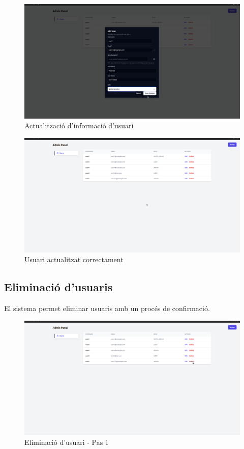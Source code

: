 \begin{figure}[H]
\centering
\includegraphics[width=0.8\linewidth]{Figures/implementacio/adminPanelUserUpdate.png}
\caption{Actualització d'informació d'usuari}
\label{fig:adminPanelUserUpdate}
\end{figure}

\begin{figure}[H]
\centering
\includegraphics[width=0.8\linewidth]{Figures/implementacio/adminPanelUserUpdateSuccess.png}
\caption{Usuari actualitzat correctament}
\label{fig:adminPanelUserUpdateSuccess}
\end{figure}

\subsection{Eliminació d'usuaris}

El sistema permet eliminar usuaris amb un procés de confirmació.

\begin{figure}[H]
\centering
\includegraphics[width=0.8\linewidth]{Figures/implementacio/adminPanelUserDelete.png}
\caption{Eliminació d'usuari - Pas 1}
\label{fig:adminPanelUserDelete}
\end{figure}

